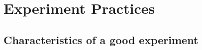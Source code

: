 \documentclass{beamer}
\begin{document}







\section{Experiment Practices}
\subsection{Characteristics of a good experiment}
\end{document}
